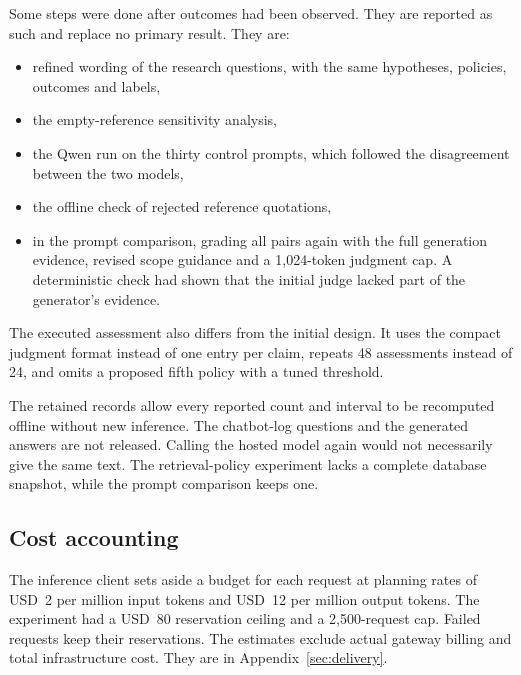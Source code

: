 Some steps were done after outcomes had been observed. They are reported as such and replace no primary result. They are:
\begin{itemize}
  \item refined wording of the research questions, with the same hypotheses, policies, outcomes and labels,
  \item the empty-reference sensitivity analysis,
  \item the Qwen run on the thirty control prompts, which followed the disagreement between the two models,
  \item the offline check of rejected reference quotations,
  \item in the prompt comparison, grading all pairs again with the full generation evidence, revised scope guidance and a 1,024-token judgment cap. A deterministic check had shown that the initial judge lacked part of the generator's evidence.
\end{itemize}
The executed assessment also differs from the initial design. It uses the compact judgment format instead of one entry per claim, repeats 48 assessments instead of 24, and omits a proposed fifth policy with a tuned threshold.

The retained records allow every reported count and interval to be recomputed offline without new inference. The chatbot-log questions and the generated answers are not released. Calling the hosted model again would not necessarily give the same text. The retrieval-policy experiment lacks a complete database snapshot, while the prompt comparison keeps one.

\subsection{Cost accounting}
\label{sec:method-cost}

The inference client sets aside a budget for each request at planning rates of USD~2 per million input tokens and USD~12 per million output tokens. The experiment had a USD~80 reservation ceiling and a 2,500-request cap. Failed requests keep their reservations. The estimates exclude actual gateway billing and total infrastructure cost. They are in Appendix~\ref{sec:delivery}.
